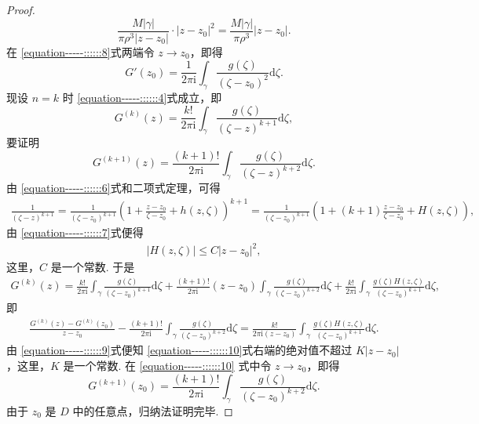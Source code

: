 \documentclass[../../main.tex]{subfiles}%
\begin{document}
\begin{proof}
\[
\frac{M |\gamma|}{\pi \rho^3 |z - z_0|} \cdot |z - z_0|^2 = \frac{M |\gamma|}{\pi \rho^3} |z - z_0|.
\]
在 \eqref{equation-----::::::8}式两端令 \( z \to z_0 \)，即得
\[
G'(z_0) = \frac{1}{2\pi \mathrm{i}} \int_{\gamma} \frac{g(\zeta)}{(\zeta - z_0)^2} \mathrm{d}\zeta.
\]
现设 \( n = k \) 时 \eqref{equation-----::::::4}式成立，即
\[
G^{(k)}(z) = \frac{k!}{2\pi \mathrm{i}} \int_{\gamma} \frac{g(\zeta)}{(\zeta - z)^{k + 1}} \mathrm{d}\zeta,
\]
要证明
\[
G^{(k + 1)}(z) = \frac{(k + 1)!}{2\pi \mathrm{i}} \int_{\gamma} \frac{g(\zeta)}{(\zeta - z)^{k + 2}} \mathrm{d}\zeta.
\]
由 \eqref{equation-----::::::6}式和二项式定理，可得
\begin{align*}
\frac{1}{(\zeta - z)^{k + 1}} = \frac{1}{(\zeta - z_0)^{k + 1}} \left( 1 + \frac{z - z_0}{\zeta - z_0} + h(z, \zeta) \right)^{k + 1} = \frac{1}{(\zeta - z_0)^{k + 1}} \left( 1 + (k + 1) \frac{z - z_0}{\zeta - z_0} + H(z, \zeta) \right),
\end{align*}
由 \eqref{equation-----::::::7}式便得
\begin{align}
|H(z, \zeta)| \leqslant C |z - z_0|^2, \label{equation-----::::::9}
\end{align}
这里，\( C \) 是一个常数. 于是
\begin{align*}
G^{(k)}(z) = \frac{k!}{2\pi \mathrm{i}} \int_{\gamma} \frac{g(\zeta)}{(\zeta - z_0)^{k + 1}} \mathrm{d}\zeta + \frac{(k + 1)!}{2\pi \mathrm{i}} (z - z_0) \int_{\gamma} \frac{g(\zeta)}{(\zeta - z_0)^{k + 2}} \mathrm{d}\zeta + \frac{k!}{2\pi \mathrm{i}} \int_{\gamma} \frac{g(\zeta)H(z, \zeta)}{(\zeta - z_0)^{k + 1}} \mathrm{d}\zeta,
\end{align*}
即
\begin{align}
\frac{G^{(k)}(z) - G^{(k)}(z_0)}{z - z_0} - \frac{(k + 1)!}{2\pi \mathrm{i}} \int_{\gamma} \frac{g(\zeta)}{(\zeta - z_0)^{k + 2}} \mathrm{d}\zeta = \frac{k!}{2\pi \mathrm{i} (z - z_0)} \int_{\gamma} \frac{g(\zeta)H(z, \zeta)}{(\zeta - z_0)^{k + 1}} \mathrm{d}\zeta. \label{equation-----::::::10}
\end{align}
由 \eqref{equation-----::::::9}式便知 \eqref{equation-----::::::10}式右端的绝对值不超过 \( K |z - z_0| \)，这里，\( K \) 是一个常数. 在 \eqref{equation-----::::::10} 式中令 \( z \to z_0 \)，即得
\[
G^{(k + 1)}(z_0) = \frac{(k + 1)!}{2\pi \mathrm{i}} \int_{\gamma} \frac{g(\zeta)}{(\zeta - z_0)^{k + 2}} \mathrm{d}\zeta.
\]
由于 \( z_0 \) 是 \( D \) 中的任意点，归纳法证明完毕. 

\end{proof}
\end{document}

